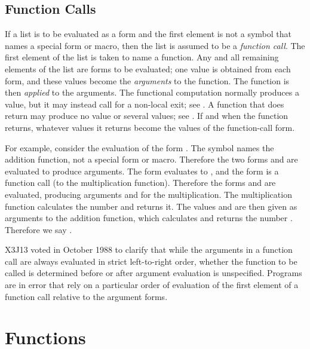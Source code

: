 \subsection{Function Calls}

If a list is to be evaluated as a form and the first element is
not a symbol that names a special form or macro, then the list
is assumed to be a \textit{function call}.  The first element of the
list is taken to name a function.  Any and all remaining elements
of the list are forms to be evaluated; one value is obtained
from each form,
and these values become the \textit{arguments} to the function.
The function is then \textit{applied} to the arguments.
The functional computation normally produces a value,
but it may instead call for a non-local exit; see .
A function that does return may produce no value or several values;
see .
If and when the function returns, whatever values it returns
become the values of the function-call form.


For example, consider the evaluation of the form .
The symbol \cd{+} names the addition function, not a special form or macro.
Therefore the two forms  and  are evaluated to produce
arguments.  The form  evaluates to , and the form
 is a function call (to the multiplication function).
Therefore the forms  and  are evaluated, producing arguments
 and  for the multiplication.  The multiplication function
calculates the number  and returns it.  The values  and 
are then given as arguments to the addition function, which calculates
and returns the number .  Therefore we say .

\begin{newer}
X3J13 voted in October 1988 
to clarify that while the arguments in a function call are always
evaluated in strict left-to-right order, whether the function to
be called is determined before or after argument evaluation
is unspecified.  Programs are in error
that rely on a particular order of evaluation
of the first element of a function call relative to the
argument forms.
\end{newer}

\section{Functions}

